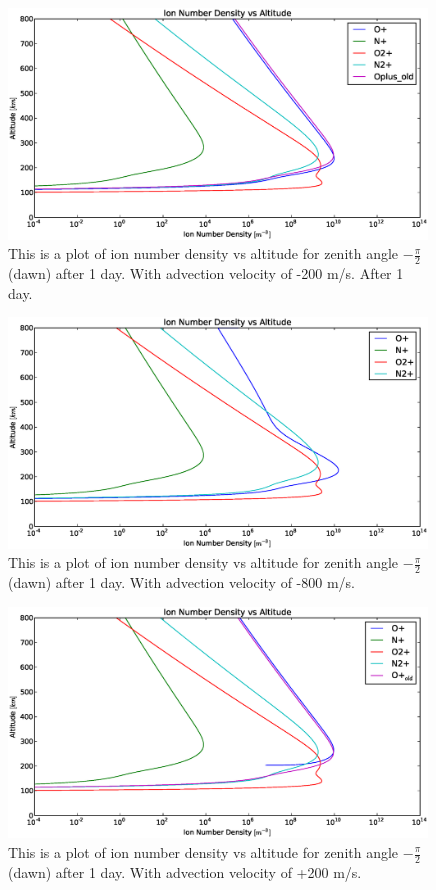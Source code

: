 \documentclass[10pt]{article}
\begin{document}
\begin{figure}[H]
	\centering
		\includegraphics[width=0.99\textwidth]{./figures/B/use/Ion_Number_Density_vs_Altitude_100_800_-200.eps}
	\caption{This is a plot of ion number density vs altitude for zenith angle $-\frac{\pi}{2}$ (dawn) after 1 day. With advection velocity of -200 m/s. After 1 day.}
	\label{fig:n1}
\end{figure}
\begin{figure}[H]
	\centering
		\includegraphics[width=0.99\textwidth]{./figures/B/use/Ion_Number_Density_vs_Altitude_100_800_-800.eps}
	\caption{This is a plot of ion number density vs altitude for zenith angle $-\frac{\pi}{2}$ (dawn) after 1 day. With advection velocity of -800 m/s.}
	\label{fig:n2}
\end{figure}
\begin{figure}[H]
	\centering
		\includegraphics[width=0.99\textwidth]{./figures/B/use/Ion_Number_Density_vs_Altitude_100_800_+200.eps}
	\caption{This is a plot of ion number density vs altitude for zenith angle $-\frac{\pi}{2}$ (dawn) after 1 day. With advection velocity of +200 m/s.}
	\label{fig:n3}
\end{figure}
\end{document}
